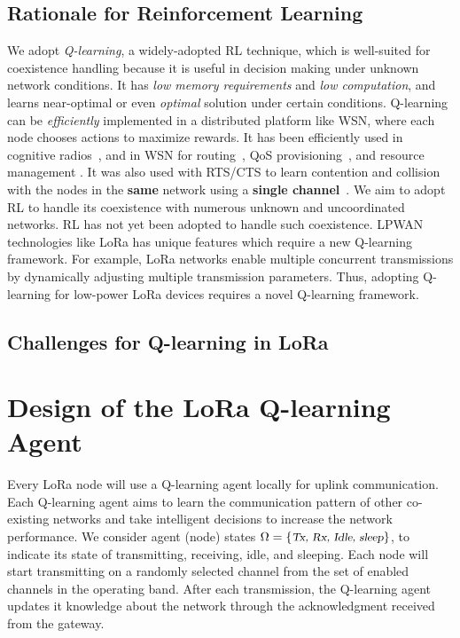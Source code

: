  
\subsection{Rationale for Reinforcement Learning} 
 We adopt {\slshape Q-learning},  a widely-adopted RL technique, which is well-suited for coexistence handling because it is useful in decision making under unknown network conditions. It has {\slshape low memory requirements} and {\slshape low computation}, and learns near-optimal or even {\slshape optimal} solution under certain conditions. Q-learning can be {\slshape efficiently} implemented in a distributed platform like WSN, where each node chooses actions to maximize rewards. It has been efficiently used in cognitive radios~\cite{cognitive1}, and in WSN for routing~\cite{RLRouting1, RLRouting2, RLRouting3, RLRouting4},  QoS provisioning~\cite{QoS1, QoS2}, and resource management \cite{RLSurvey}. It was also used with  RTS/CTS  to learn contention and collision with the nodes in the {\bf same} network  using a {\bf single channel}~\cite{RLMAC}. 
We aim to adopt RL to handle its coexistence with numerous  unknown and uncoordinated networks. RL has not yet been adopted to handle such coexistence. LPWAN technologies like LoRa has unique features which require a new Q-learning framework. For example, LoRa networks enable multiple concurrent transmissions by dynamically adjusting multiple transmission parameters. Thus, adopting Q-learning for low-power LoRa devices requires a novel Q-learning framework.


\subsection{Challenges for Q-learning in LoRa}



\section{Design of the LoRa Q-learning Agent}
Every LoRa node will use a Q-learning agent locally for uplink communication. Each Q-learning agent aims to learn the communication pattern of other co-existing networks and take intelligent decisions to increase the network performance. We  consider agent (node) states $\Omega=\{\text{\slshape \small Tx, Rx, Idle, sleep}  \}$, to indicate its state of transmitting, receiving, idle,  and sleeping. Each node will start transmitting on a randomly selected channel from the set of enabled channels in the operating band. After each transmission, the Q-learning agent updates it knowledge about the network through the acknowledgment received from the gateway. 

